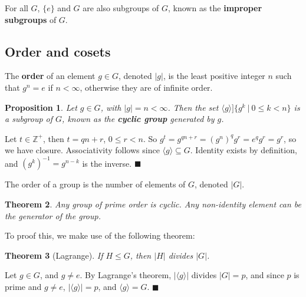 \documentclass[letter-paper]{tufte-book}
\newtheorem{theorem}{\color{pastel-blue}Theorem}[section]
\newtheorem{proposition}[theorem]{\color{pastel-blue}Proposition}
\newenvironment{proof}[1][Proof]{\begin{trivlist}
\item[\hskip \labelsep {\bfseries #1}]}{\end{trivlist}}
\newcommand\Def[1]{\textbf{#1}}
\newcommand{\qed}{\hfill$\blacksquare$}
\begin{document}
For all $G$, $\{e\}$ and $G$ are also subgroups of $G$, known as the
\Def{improper subgroups} of $G$.


\subsection{Order and cosets}

The \Def{order} of an element $g\in G$, denoted $|g|$, is the least
positive integer $n$ such that $g^n=e$ if $n<\infty$, otherwise they are of
infinite order.
\begin{proposition}
  Let $g\in G$, with $|g|=n<\infty$. Then the set $\langle g\rangle]\{g^k\ |\ 0
  \leq k<n\}$ is a subgroup of $G$, known as the \Def{cyclic group} 
  generated by $g$.
\end{proposition}
\begin{proof}
  Let $t\in\mathbb{Z}^+$, then $t=qn+r$, $0\leq r<n$. So $g^t = g^{qn+r} = 
  (g^n)^q g^r = e^q g^r = g^r$, so we have closure. Associativity follows since 
  $\langle g\rangle\subseteq G$. Identity exists by definition, and $(g^k)^{-1}
  =g^{n-k}$ is the inverse. \qed
\end{proof}

The order of a group is the number of elements of $G$, denoted $|G|$.
\begin{theorem}
  Any group of prime order is cyclic. Any non-identity element can be the 
  generator of the group.
\end{theorem}
To proof this, we make use of the following theorem:
\begin{theorem}[Lagrange]
  If $H\leq G$, then $|H|$ divides $|G|$.
\end{theorem}
\begin{proof}[Proof of theorem above]
  Let $g\in G$, and $g\neq e$. By Lagrange's theorem, $|\langle g\rangle|$ 
  divides $|G|=p$, and since $p$ is prime and $g\neq e$, $|\langle g\rangle|=p$, 
  and $\langle g\rangle=G$. \qed
\end{proof}
\end{document}
